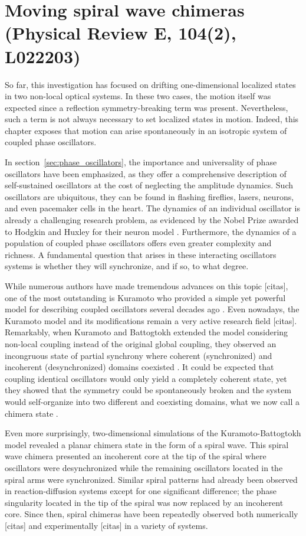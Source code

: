 \chapter{Moving spiral wave chimeras (Physical Review E, 104(2), L022203)}

So far, this investigation has focused on drifting one-dimensional localized states in
two non-local optical systems. 
In these two cases, the motion itself was expected since a reflection
symmetry-breaking term was present. Nevertheless, such a term is not always
necessary to set localized states in motion. Indeed, this chapter exposes that motion can arise spontaneously
in an isotropic system of coupled phase oscillators.

In section~\ref{sec:phase_oscillators}, the importance
and universality of phase oscillators have been emphasized, as they offer a comprehensive
description of self-sustained oscillators at the cost of neglecting the amplitude 
dynamics. Such oscillators are ubiquitous, they can be found in flashing fireflies, lasers, neurons, and even pacemaker cells in the heart.
The dynamics of an individual oscillator is already a challenging research problem, as evidenced
by the Nobel Prize awarded to Hodgkin and Huxley for their neuron model
\cite{hodgkin1952quantitative}.
Furthermore, the dynamics of a population of coupled phase oscillators
offers even greater complexity and richness. A fundamental question that
arises in these interacting oscillators systems is whether they will synchronize, 
and if so, to what degree.

While numerous authors have made tremendous advances on this topic [citas], one of the
most outstanding is Kuramoto who provided a simple yet powerful model 
for describing coupled oscillators several decades ago \cite{kuramoto1975model}. 
Even nowadays, the Kuramoto
model and its modifications remain a very active research field [citas].
Remarkably, when Kuramoto and Battogtokh extended the model considering non-local coupling instead
of the original global coupling, they observed an incongruous state
of partial synchrony where coherent (synchronized) and incoherent (desynchronized) domains coexisted \cite{kuramoto2002coexistence}.
It could be expected that coupling identical oscillators would only yield a completely coherent
state, yet they showed that the symmetry could be spontaneously broken and the system
would self-organize into two different and coexisting domains, what we now call a chimera state \cite{abrams2004chimera}.

Even more surprisingly, two-dimensional simulations of the Kuramoto-Battogtokh model
revealed a planar chimera state in the form of a spiral wave. This spiral wave chimera
presented an incoherent core at the tip of the spiral where oscillators were desynchronized
while the remaining oscillators located in the spiral arms were synchronized. Similar spiral
patterns had already been observed in reaction-diffusion systems except for one significant
difference; the phase singularity located in the tip of the spiral was now replaced by
an incoherent core. Since then, spiral chimeras have been repeatedly observed both numerically [citas] and experimentally [citas]
in a variety of systems. 

